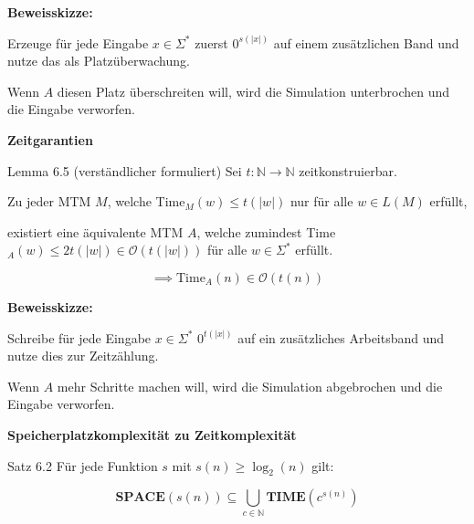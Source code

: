 \documentclass[a4paper, 11pt]{article}
\def\N{\mathbb{N}}
\def\O{\mathcal{O}}
\newcommand\myTitle[1]{{\large \textbf {#1}}}
\begin{document}
                            \textbf{Beweisskizze: }
                            
                            Erzeuge für jede Eingabe $x \in \Sigma^*$ zuerst $0^{s(|x|)}$ auf einem zusätzlichen Band und nutze das als Platzüberwachung. 
                            
                            
                            Wenn $A$ diesen Platz überschreiten will, wird die Simulation unterbrochen und die Eingabe verworfen.
                        
                        \myTitle{Zeitgarantien}
                            \begin{mainbox}{Lemma 6.5 (verständlicher formuliert)}
                                Sei $t: \N \to \N$ zeitkonstruierbar. 
                                
                                Zu jeder MTM $M$, welche Time$_M(w) \leq t(|w|)$ nur für alle $w \in L(M)$ erfüllt, 
                                
                                existiert eine äquivalente MTM $A$, welche zumindest Time$_A(w) \leq 2t(|w|) \in \O(t(|w|))$ für alle $w \in \Sigma^*$ erfüllt.
                        
                                $$\implies \text{Time}_A(n) \in \O(t(n))$$
                            \end{mainbox}
                            
                            \textbf{Beweisskizze: }
                            
                            Schreibe für jede Eingabe $x \in \Sigma^*$ $0^{t(|x|)}$ auf ein zusätzliches Arbeitsband und nutze dies zur Zeitzählung. 
                            
                            
                            Wenn $A$ mehr Schritte machen will, wird die Simulation abgebrochen und die Eingabe verworfen.
                        
                        \myTitle{Speicherplatzkomplexität zu Zeitkomplexität}
                            \begin{mainbox}{Satz 6.2}
                                Für jede Funktion $s$ mit $s(n) \geq \log_2(n)$ gilt:
                        
                            $$\textbf{SPACE}(s(n)) \subseteq \bigcup_{c \in \N} \textbf{TIME}(c^{s(n)})$$
                            \end{mainbox}
                            
\end{document}
